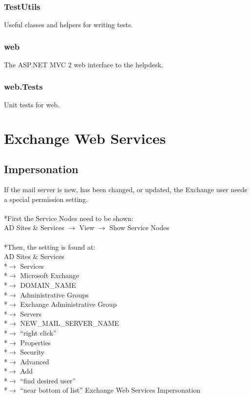 \documentclass{article}
\begin{document}
\subsubsection{TestUtils}
Useful classes and helpers for writing tests.
\subsubsection{web}
The ASP.NET MVC 2 web interface to the helpdesk.
\subsubsection{web.Tests}
Unit tests for web.
\section{Exchange Web Services}
\subsection{Impersonation}
If the mail server is new, has been changed, or updated, the Exchange user needs a special permission setting.\\
\\*First the Service Nodes need to be shown:\\
\indent AD Sites \& Services $\rightarrow$ View $\rightarrow$ Show Service Nodes\\
\\*Then, the setting is found at:\\
\indent AD Sites \& Services
\\*\indent\indent $\rightarrow$ Services
\\*\indent\indent $\rightarrow$ Microsoft Exchange
\\*\indent\indent $\rightarrow$ DOMAIN\_NAME
\\*\indent\indent $\rightarrow$ Administrative Groups
\\*\indent\indent $\rightarrow$ Exchange Administrative Group
\\*\indent\indent $\rightarrow$ Servers
\\*\indent\indent $\rightarrow$ NEW\_MAIL\_SERVER\_NAME
\\*\indent\indent $\rightarrow$ ``right click''
\\*\indent\indent $\rightarrow$ Properties
\\*\indent\indent $\rightarrow$ Security
\\*\indent\indent $\rightarrow$ Advanced
\\*\indent\indent $\rightarrow$ Add
\\*\indent\indent $\rightarrow$ ``find desired user''
\\*\indent\indent $\rightarrow$ ``near bottom of list'' Exchange Web Services Impersonation
\end{document}
